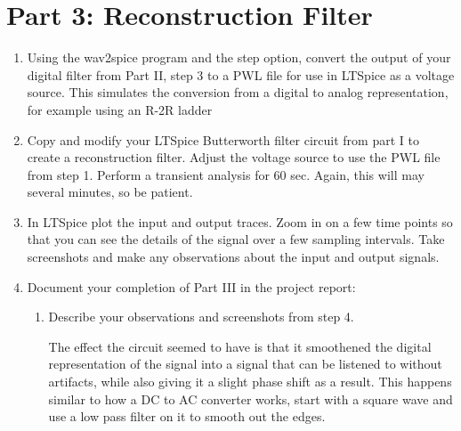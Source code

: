 \documentclass{article}
\begin{document}
\section*{Part 3: Reconstruction Filter}
\begin{enumerate}
    \item Using the wav2spice program and the step option, convert the output of your digital filter from Part II, step 3 to a PWL file for use in LTSpice as a voltage source. This simulates the conversion from a digital to analog representation, for example using an R-2R ladder
    \item Copy and modify your LTSpice Butterworth filter circuit from part I to create a reconstruction filter. Adjust the voltage source to use the PWL file from step 1. Perform a transient analysis for 60 sec. Again, this will may several minutes, so be patient.
    \begin{center}
    \end{center}
    \item In LTSpice plot the input and output traces. Zoom in on a few time points so that you can see the details of the signal over a few sampling intervals. Take screenshots and make any observations about the input and output signals.
    \begin{center}
    \end{center}
    \item Document your completion of Part III in the project report:
    \begin{enumerate}
        \item Describe your observations and screenshots from step 4.
        \begin{center}
            The effect the circuit seemed to have is that it smoothened the digital representation of the signal into a signal that can be listened to without artifacts, while also giving it a slight phase shift as a result. This happens similar to how a DC to AC converter works, start with a square wave and use a low pass filter on it to smooth out the edges.
        \end{center}
    \end{enumerate}
\end{enumerate}
\end{document}
